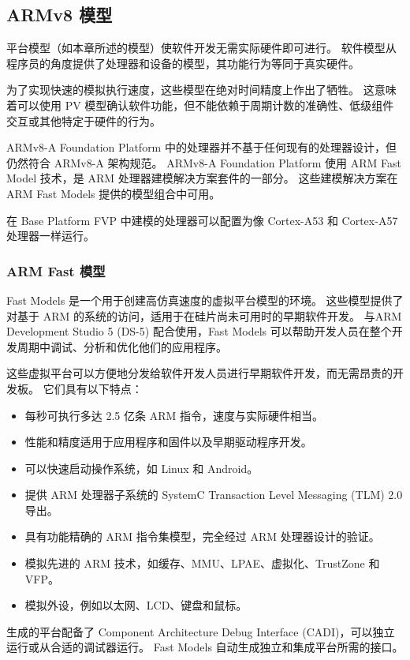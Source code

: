 \subsection{ARMv8 模型}

平台模型（如本章所述的模型）使软件开发无需实际硬件即可进行。
软件模型从程序员的角度提供了处理器和设备的模型，其功能行为等同于真实硬件。

为了实现快速的模拟执行速度，这些模型在绝对时间精度上作出了牺牲。
这意味着可以使用 PV 模型确认软件功能，但不能依赖于周期计数的准确性、低级组件交互或其他特定于硬件的行为。

ARMv8-A Foundation Platform 中的处理器并不基于任何现有的处理器设计，但仍然符合 ARMv8-A 架构规范。
ARMv8-A Foundation Platform 使用 ARM Fast Model 技术，是 ARM 处理器建模解决方案套件的一部分。
这些建模解决方案在 ARM Fast Models 提供的模型组合中可用。

在 Base Platform FVP 中建模的处理器可以配置为像 Cortex-A53 和 Cortex-A57 处理器一样运行。

\subsubsection{ARM Fast 模型}

Fast Models 是一个用于创建高仿真速度的虚拟平台模型的环境。
这些模型提供了对基于 ARM 的系统的访问，适用于在硅片尚未可用时的早期软件开发。
与ARM Development Studio 5 (DS-5) 配合使用，Fast Models 可以帮助开发人员在整个开发周期中调试、分析和优化他们的应用程序。

这些虚拟平台可以方便地分发给软件开发人员进行早期软件开发，而无需昂贵的开发板。
它们具有以下特点：

\begin{itemize}
\item
  每秒可执行多达 2.5 亿条 ARM 指令，速度与实际硬件相当。
\item
  性能和精度适用于应用程序和固件以及早期驱动程序开发。
\item
  可以快速启动操作系统，如 Linux 和 Android。
\item
  提供 ARM 处理器子系统的 SystemC Transaction Level Messaging (TLM) 2.0
  导出。
\item
  具有功能精确的 ARM 指令集模型，完全经过 ARM 处理器设计的验证。
\item
  模拟先进的 ARM 技术，如缓存、MMU、LPAE、虚拟化、TrustZone 和 VFP。
\item
  模拟外设，例如以太网、LCD、键盘和鼠标。
\end{itemize}

生成的平台配备了 Component Architecture Debug Interface (CADI)，可以独立运行或从合适的调试器运行。
Fast Models 自动生成独立和集成平台所需的接口。

